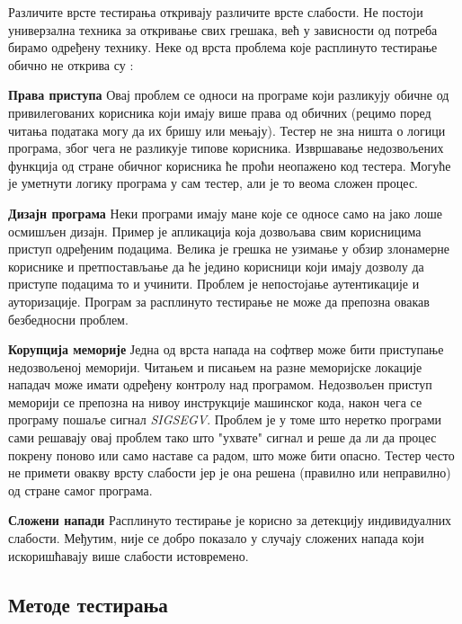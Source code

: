 \documentclass[12pt,oneside]{memoir}
\begin{document}
Различите врсте тестирања откривају различите врсте слабости. Не постоји универзална техника за откривање свих грешака, већ у зависности од потреба бирамо одређену технику. Неке од врста проблема које расплинуто тестирање обично не открива су \cite{fuzzingBrute}:
\begin{description}
\item \textbf{Права приступа} Овај проблем се односи на програме који разликују обичне од привилегованих корисника који имају више права од обичних (рецимо поред читања података могу да их бришу или мењају). Тестер не зна ништа о логици програма, због чега не разликује типове корисника. Извршавање недозвољених функција од стране обичног корисника ће проћи неопажено код тестера. Могуће је уметнути логику програма у сам тестер, али је то веома сложен процес.  
\item \textbf{Дизајн програма} Неки програми имају мане које се односе само на јако лоше осмишљен дизајн. Пример је апликација која дозвољава свим корисницима приступ одређеним подацима. Велика је грешка не узимање у обзир злонамерне кориснике и претпостављање да ће једино корисници који имају дозволу да приступе подацима то и учинити. Проблем је непостојање аутентикације и ауторизације. Програм за расплинуто тестирање не може да препозна овакав безбедносни проблем.
\item \textbf{Корупција меморије} Једна од врста напада на софтвер може бити приступање недозвољеној меморији. Читањем и писањем на разне меморијске локације нападач може имати одређену контролу над програмом. Недозвољен приступ меморији се препозна на нивоу инструкције машинског кода, након чега се програму пошаље сигнал \textit{SIGSEGV}. Проблем је у томе што неретко програми сами решавају овај проблем тако што "ухвате" сигнал и реше да ли да процес покрену поново или само наставе са радом, што може бити опасно. Тестер често не примети овакву врсту слабости јер је она решена (правилно или неправилно) од стране самог програма.
\item \textbf{Сложени напади} Расплинуто тестирање је корисно за детекцију индивидуалних слабости. Међутим, није се добро показало у случају сложених напада који искоришћавају више слабости истовремено.
\end{description}

\subsection{Методе тестирања}
\label{subsec:metode}
\end{document}

